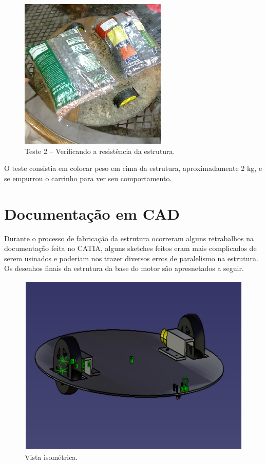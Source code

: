 \begin{figure}[H]
	\centering
	\includegraphics[scale=0.3]{figuras/base_teste_peso.png}
	\caption{Teste 2 – Verificando a resistência da estrutura.}
	\label{img:base_teste_peso}
\end{figure}

O teste consistia em colocar peso em cima da estrutura, aproximadamente 2 kg, e se empurrou o carrinho para ver seu comportamento.

\section{Documentação em CAD}

Durante o processo de fabricação da estrutura ocorreram alguns retrabalhos na documentação feita no CATIA, alguns sketches feitos eram mais complicados de serem usinados e poderiam nos trazer diversos erros de paralelismo na estrutura. Os desenhos finais da estrutura da base do motor são apresnetados a seguir.

\begin{figure}[H]
	\centering
	\includegraphics[scale=0.3]{figuras/vista_isometrica.png}
	\caption{Vista isométrica.}
	\label{img:vista_isometrica}
\end{figure}

